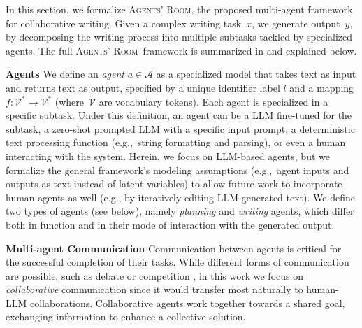 \documentclass{article}
\newcommand{\Agentsroom}{\textsc{Agents' Room}}
\newcommand{\fantine}[1]{{\textcolor{blue}{\bf{Fantine:} \emph{#1}}}}
\begin{document}
In this section, we 
formalize \Agentsroom, the proposed multi-agent framework for collaborative writing. Given a complex writing task~$x$,  we generate output~$y$, by decomposing the writing process into multiple subtasks tackled by specialized agents. The full \Agentsroom\ framework is summarized in  and explained below.

\textbf{Agents} We define an {\it agent} $a \in \mathcal{A}$ as a
specialized model that takes text as input and returns text as output,
specified by a unique identifier label $l$ and a mapping $f:
\mathcal{V}^* \to \mathcal{V}^*$ (where~$\mathcal{V}$ are vocabulary
tokens). Each agent is specialized in a specific subtask. Under this
definition, an agent can be a LLM fine-tuned for the subtask, a
zero-shot prompted LLM with a specific input prompt, a deterministic
text processing function (e.g.,~string formatting and parsing),
or even a human interacting with the system. Herein, we focus on
LLM-based agents, but we formalize the general framework's modeling
assumptions (e.g.,~agent inputs and outputs as text instead of latent
variables) to allow future work to incorporate human agents as well
(e.g., by iteratively editing LLM-generated text). We define two types
of agents (see below), namely {\it planning} and {\it writing} agents,
which differ both in function and in their mode of interaction with
the generated output.


\textbf{Multi-agent Communication} Communication between agents is critical for the successful completion of their tasks. 
While different forms of communication are possible, such as debate \citep{khan2024debating,zhang-etal-2024-exploring} or competition \citep{cheng2024self}, in this work we focus on  {\it collaborative} communication  since it would transfer most naturally to human-LLM collaborations. Collaborative agents work together towards a shared goal, exchanging information to enhance a collective solution.
\end{document}
